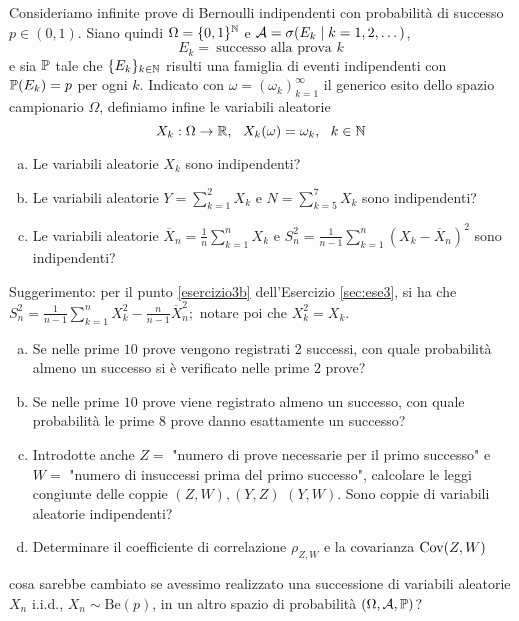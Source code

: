 Consideriamo infinite prove di Bernoulli indipendenti con probabilità di successo $p\in (0,1)$. Siano quindi $\Omega =\{0,1\}^{\mathbb{N}}$ e $\mathcal{A} =\sigma (E_{k} \mid k=1,2,\dots)$,
\begin{equation*}
E_{k} =\ \text{successo alla prova } k
\end{equation*}
e sia $\mathbb{P}$ tale che $\{E_{k}\}_{k\in \mathbb{N}}$ risulti una famiglia di eventi indipendenti con $\mathbb{P}(E_{k}) =p$ per ogni $k$. Indicato con $\omega =(\omega_{k})_{k=1}^{\infty }$ il generico esito dello spazio campionario $\Omega $, definiamo infine le variabili aleatorie
\begin{equation*}
X_{k} :\Omega \rightarrow \mathbb{R} ,\ \ X_{k} (\omega)=\omega_{k} ,\ \ k\in \mathbb{N}
\end{equation*}
\begin{enumerate}[a)]
	\item Le variabili aleatorie $X_{k}$ sono indipendenti?
	\item Le variabili aleatorie $Y=\sum_{k=1}^{2} X_{k}$ e $N=\sum_{k=5}^{7} X_{k}$ sono indipendenti?
	\item Le variabili aleatorie $\overline{X}_{n} =\frac{1}{n}\sum_{k=1}^{n} X_{k}$ e $S_{n}^{2} =\frac{1}{n-1}\sum_{k=1}^{n}(X_{k} -\overline{X}_{n})^{2}$ sono indipendenti?
\end{enumerate}
Suggerimento: per il punto \ref{esercizio3b} dell'Esercizio \ref{sec:ese3}, si ha che $S_{n}^{2} =\frac{1}{n-1}\sum_{k=1}^{n} X_{k}^{2} -\frac{n}{n-1}\overline{X}_{n}^{2} ;$ notare poi che $X_{k}^{2} =X_{k}$.
\begin{enumerate}[a),resume]
	\item Se nelle prime $10$ prove vengono registrati $2$ successi, con quale probabilità almeno un successo si è verificato nelle prime $2$ prove?
	\item Se nelle prime $10$ prove viene registrato almeno un successo, con quale probabilità le prime $8$ prove danno esattamente un successo?
	\item Introdotte anche $Z=$ "numero di prove necessarie per il primo successo" e $W=$ "numero di insuccessi prima del primo successo", calcolare le leggi congiunte delle coppie $(Z,W),(Y,Z)$ $(Y,W).$ Sono coppie di variabili aleatorie indipendenti?
	\item Determinare il coefficiente di correlazione $\rho _{Z,W}$ e la covarianza $\operatorname{Cov} (Z,W)$
\end{enumerate}
cosa sarebbe cambiato se avessimo realizzato una successione di variabili aleatorie $X_{n}$ i.i.d., $X_{n} \sim \mathrm{Be} (p)$, in un altro spazio di probabilità $(\Omega,\mathcal{A},\mathbb{P})$?

